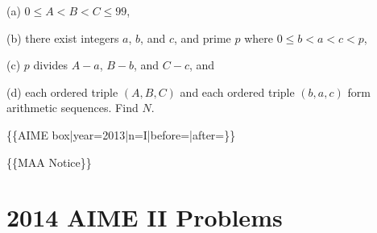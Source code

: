 \documentclass{article}
\begin{document}
\begin{enumerate}[label=\arabic*., itemsep=0.5em]
(a) \(0\le A<B<C\le99\), 

(b) there exist integers \(a\), \(b\), and \(c\), and prime \(p\) where \(0\le b<a<c<p\), 

(c) \(p\) divides \(A-a\), \(B-b\), and \(C-c\), and 

(d) each ordered triple \((A,B,C)\) and each ordered triple \((b,a,c)\) form arithmetic sequences. Find \(N\).



\{\{AIME box|year=2013|n=I|before=|after=\}\}

\{\{MAA Notice\}\}\par \vspace{0.5em}
\end{enumerate}
\newpage\section*{2014 AIME II Problems}
\end{document}
